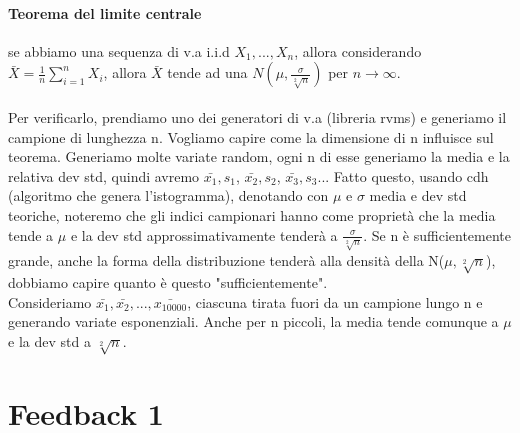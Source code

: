 \documentclass{article}
\begin{document}
\paragraph{Teorema del limite centrale}se abbiamo una sequenza di v.a i.i.d $X_1, ..., X_n$, allora considerando $\bar{X} =  \frac{1}{n}\sum\limits_{i=1}^{n} X_i$, allora $\bar{X}$ tende ad una $N(\mu, \frac{\sigma}{\sqrt[2]{n}})$ per $n \rightarrow \infty$.\\\\ Per verificarlo, prendiamo uno dei generatori di v.a (libreria rvms) e generiamo il campione di lunghezza n. Vogliamo capire come la dimensione di n influisce sul teorema. Generiamo molte variate random, ogni n di esse generiamo la media e la relativa dev std, quindi avremo $\bar{x_1}, s_1$, $\bar{x_2}, s_2$, $\bar{x_3}, s_3$... Fatto questo, usando cdh (algoritmo che genera l'istogramma), denotando con $\mu$ e $\sigma$ media e dev std teoriche, noteremo che gli indici campionari hanno come proprietà che la media tende a $\mu$ e la dev std approssimativamente tenderà a $\frac{\sigma}{\sqrt[2]{n}}$. Se n è sufficientemente grande, anche la forma della distribuzione tenderà alla densità della N($\mu, \sqrt[2]{n}$), dobbiamo capire quanto è questo "sufficientemente".\\ Consideriamo $\bar{x_1}, \bar{x_2}, ..., \bar{x_{10000}}$, ciascuna tirata fuori da un campione lungo n e generando variate esponenziali. Anche per n piccoli, la media tende comunque a $\mu$ e la dev std a $\sqrt[2]{n}$.



\newpage
\section{Feedback 1}
\end{document}
